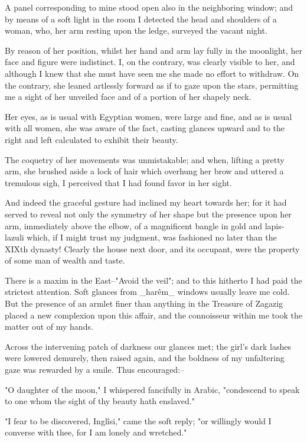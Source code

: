 A panel corresponding to mine stood open also in the neighboring
window; and by means of a soft light in the room I detected the head
and shoulders of a woman, who, her arm resting upon the ledge,
surveyed the vacant night.

By reason of her position, whilst her hand and arm lay fully in the
moonlight, her face and figure were indistinct. I, on the contrary,
was clearly visible to her, and although I knew that she must have
seen me she made no effort to withdraw. On the contrary, she leaned
artlessly forward as if to gaze upon the stars, permitting me a sight
of her unveiled face and of a portion of her shapely neck.

Her eyes, as is usual with Egyptian women, were large and fine, and
as is usual with all women, she was aware of the fact, casting glances
upward and to the right and left calculated to exhibit their beauty.

The coquetry of her movements was unmistakable; and when, lifting a
pretty arm, she brushed aside a lock of hair which overhung her brow
and uttered a tremulous sigh, I perceived that I had found favor in
her sight.

And indeed the graceful gesture had inclined my heart towards her;
for it had served to reveal not only the symmetry of her shape but the
presence upon her arm, immediately above the elbow, of a magnificent
bangle in gold and lapis-lazuli which, if I might trust my judgment,
was fashioned no later than the XIXth dynasty! Clearly the house next
door, and its occupant, were the property of some man of wealth and
taste.

There is a maxim in the East--"Avoid the veil"; and to this hitherto
I had paid the strictest attention. Soft glances from _harêm_ windows
usually leave me cold. But the presence of an armlet finer than
anything in the Treasure of Zagazig placed a new complexion upon this
affair, and the connoisseur within me took the matter out of my hands.

Across the intervening patch of darkness our glances met; the girl's
dark lashes were lowered demurely, then raised again, and the boldness
of my unfaltering gaze was rewarded by a smile. Thus encouraged:--

"O daughter of the moon," I whispered fancifully in Arabic,
"condescend to speak to one whom the sight of thy beauty hath
enslaved."

"I fear to be discovered, Inglîsi," came the soft reply; "or willingly
would I converse with thee, for I am lonely and wretched."


